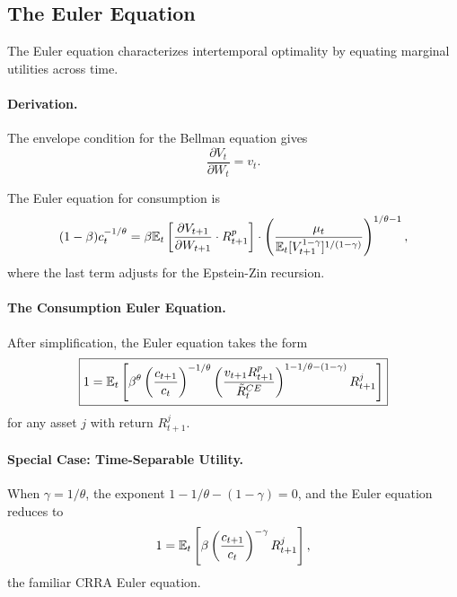 \subsection{The Euler Equation}
\label{subsec:euler}

The Euler equation characterizes intertemporal optimality by equating marginal utilities across time.

\paragraph{Derivation.}

The envelope condition for the Bellman equation gives
\begin{equation}
\frac{\partial V_t}{\partial W_t} = v_t.
\label{eq:envelope}
\end{equation}

The Euler equation for consumption is
\begin{equation}
(1-\beta) c_t^{-1/\theta} = \beta \mathbb{E}_t\left[ \frac{\partial V_{t+1}}{\partial W_{t+1}} \cdot R_{t+1}^p \right] \cdot \left( \frac{\mu_t}{\mathbb{E}_t[V_{t+1}^{1-\gamma}]^{1/(1-\gamma)}} \right)^{1/\theta - 1},
\label{eq:euler-raw}
\end{equation}
where the last term adjusts for the Epstein-Zin recursion.

\paragraph{The Consumption Euler Equation.}

After simplification, the Euler equation takes the form
\begin{equation}
\boxed{1 = \mathbb{E}_t\left[ \beta^{\theta} \left( \frac{c_{t+1}}{c_t} \right)^{-1/\theta} \left( \frac{v_{t+1} R_{t+1}^p}{\tilde{R}_t^{CE}} \right)^{1 - 1/\theta - (1-\gamma)} R_{t+1}^j \right]}
\label{eq:euler-ez}
\end{equation}
for any asset $j$ with return $R_{t+1}^j$.

\paragraph{Special Case: Time-Separable Utility.}

When $\gamma = 1/\theta$, the exponent $1 - 1/\theta - (1-\gamma) = 0$, and the Euler equation reduces to
\begin{equation}
1 = \mathbb{E}_t\left[ \beta \left( \frac{c_{t+1}}{c_t} \right)^{-\gamma} R_{t+1}^j \right],
\label{eq:euler-crra}
\end{equation}
the familiar CRRA Euler equation.

